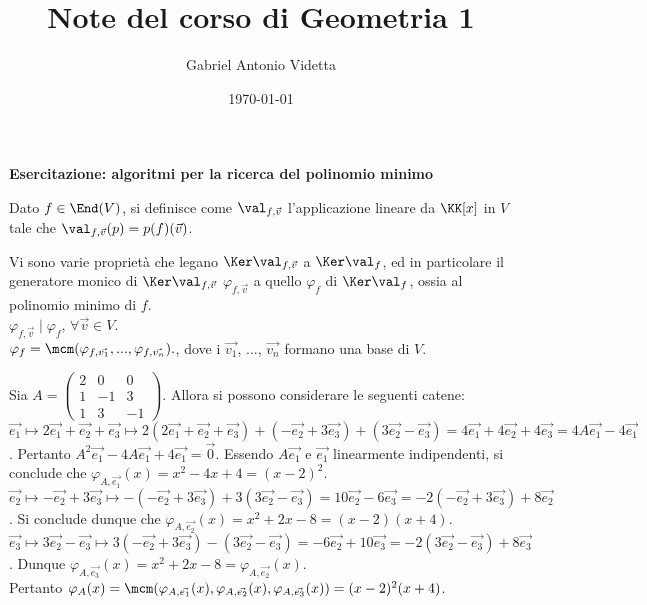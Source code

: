 \documentclass[11pt]{article}
\title{\textbf{Note del corso di Geometria 1}}
\author{Gabriel Antonio Videtta}
\date{\today}
\begin{document}
\maketitle

\begin{center}
    \Large \textbf{Esercitazione: algoritmi per la ricerca del polinomio minimo}
\end{center}

\begin{definition} Dato $f \in \End(V)$, si definisce
come $\val_{f, \vec{v}}$ l'applicazione
lineare da $\KK[x]$ in $V$ tale che
$\val_{f, \vec{v}}(p) = p(f)(\vec{v})$.
\end{definition}

\begin{remark} Vi sono varie proprietà
che legano $\Ker \val_{f, \vec{v}}$
a $\Ker \val_f$, ed in particolare
il generatore monico di $\Ker \val_{f, \vec{v}}$
$\varphi_{f, \vec{v}}$ a quello
$\varphi_{f}$ di $\Ker \val_f$, ossia al polinomio minimo di $f$. \\

\li $\varphi_{f, \vec{v}} \mid \varphi_{f}$, $\forall \vec{v} \in V$. \\
\li $\varphi_{f} = \mcm(\varphi_{f, \vec{v_1}}, ..., \varphi_{f, \vec{v_n}}).$, dove i $\vec{v_1}$, ...,
$\vec{v_n}$ formano una base di $V$. \\
\end{remark}

\begin{example} Sia $A = \begin{pmatrix}2 & 0 & 0 \\ 1 & -1 & 3 \\ 1 & 3 & -1 \end{pmatrix}$. Allora
si possono considerare le seguenti
catene: \\

\li $\vec{e_1} \mapsto 2\vec{e_1} + \vec{e_2} + \vec{e_3} \mapsto 2(2\vec{e_1} + \vec{e_2} + \vec{e_3}) + (-\vec{e_2} + 3\vec{e_3})
+ (3\vec{e_2} -\vec{e_3}) = 4\vec{e_1} + 4\vec{e_2} + 4\vec{e_3} = 4 A \vec{e_1} - 4 \vec{e_1}$.
Pertanto $A^2 \vec{e_1} - 4 A \vec{e_1} + 4 \vec{e_1} = \vec{0}$.
Essendo $A \vec{e_1}$ e $\vec{e_1}$ linearmente indipendenti, si conclude
che $\varphi_{A, \vec{e_1}}(x) = x^2 - 4x + 4 = (x-2)^2$. \\
\li $\vec{e_2} \mapsto -\vec{e_2} + 3\vec{e_3} \mapsto -(-\vec{e_2} + 3\vec{e_3}) + 3(3\vec{e_2} -\vec{e_3}) = 10\vec{e_2} - 6\vec{e_3} = -2(-\vec{e_2} + 3\vec{e_3}) + 8\vec{e_2}$.
Si conclude dunque che $\varphi_{A, \vec{e_2}}(x) = x^2+2x-8 = (x-2)(x+4)$. \\
\li $\vec{e_3} \mapsto 3\Vec{e_2}-\Vec{e_3} \mapsto 3(-\Vec{e_2} + 3\Vec{e_3}) - (3\Vec{e_2} - \Vec{e_3}) = -6\Vec{e_2} + 10\Vec{e_3} = -2(3\Vec{e_2} - \Vec{e_3}) + 8\Vec{e_3}$. Dunque
$\varphi_{A,\Vec{e_3}}(x) = x^2+2x-8 = \varphi_{A,\Vec{e_2}}(x)$. \\

Pertanto $\varphi_A(x) = \mcm(\varphi_{A,\Vec{e_1}}(x),\varphi_{A,\Vec{e_2}}(x),\varphi_{A,\Vec{e_3}}(x)) = (x-2)^2(x+4)$.
\end{example}
\end{document}
